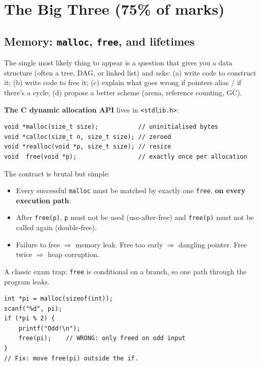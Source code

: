 \documentclass[11pt,a4paper]{article}
\begin{document}
\hrulefill

\section{The Big Three (75\% of marks)}

\subsection{Memory: \texttt{malloc}, \texttt{free}, and lifetimes}

\begin{must}
The single most likely thing to appear is a question that gives you a data structure (often a tree, DAG, or linked list) and asks: (a) write code to construct it; (b) write code to free it; (c) explain what goes wrong if pointers alias / if there's a cycle; (d) propose a better scheme (arena, reference counting, GC).
\end{must}

\textbf{The C dynamic allocation API} lives in \texttt{<stdlib.h>}:

\begin{lstlisting}
void *malloc(size_t size);           // uninitialised bytes
void *calloc(size_t n, size_t size); // zeroed
void *realloc(void *p, size_t size); // resize
void  free(void *p);                 // exactly once per allocation
\end{lstlisting}

The contract is brutal but simple:
\begin{itemize}[leftmargin=*,itemsep=1pt]
  \item Every successful \texttt{malloc} must be matched by exactly one \texttt{free}, \textbf{on every execution path}.
  \item After \texttt{free(p)}, \texttt{p} must not be used (use-after-free) and \texttt{free(p)} must not be called again (double-free).
  \item Failure to free $\Rightarrow$ memory leak. Free too early $\Rightarrow$ dangling pointer. Free twice $\Rightarrow$ heap corruption.
\end{itemize}

\begin{gotcha}
A classic exam trap: \texttt{free} is conditional on a branch, so one path through the program leaks.

\begin{lstlisting}
int *pi = malloc(sizeof(int));
scanf("%d", pi);
if (*pi % 2) {
    printf("Odd!\n");
    free(pi);    // WRONG: only freed on odd input
}
// Fix: move free(pi) outside the if.
\end{lstlisting}
\end{gotcha}
\end{document}
